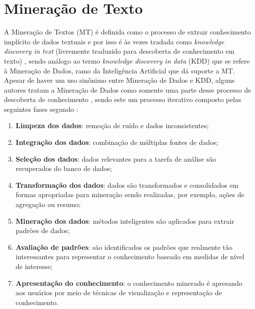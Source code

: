 \section{Mineração de Texto} \label{sec:MineraçãoTexto}
A Mineração de Textos (MT) é definida como o processo de extrair conhecimento implícito de dados textuais \cite{Jo2018TMCIBDC,Feldman:2006:TMH:1076381} e por isso é às vezes tradada como \textit{knowledge discovery in text} (livremente traduzido para descoberta de conhecimento em texto) \cite{Kodratoff:1999:KDT:646358.689959, Feldman:1995:KDT:3001335.3001354}, sendo análogo ao termo \textit{knowledge discovery in data} (KDD) que se refere à Mineração de Dados, ramo da Inteligência Artificial que dá suporte a MT. 
Apesar de haver um uso sinônimo entre Mineração de Dados e KDD, alguns autores tratam a Mineração de Dados como somente uma parte desse processo de descoberta de conhecimento \cite[p.~6]{Han:2011:DMC:1972541}, sendo este um processo iterativo composto pelas seguintes fases segundo :
\begin{enumerate}
    \item \textbf{Limpeza dos dados}: remoção de ruído e dados inconsistentes;
    \item \textbf{Integração dos dados}: combinação de múltiplas fontes de dados;
    \item \textbf{Seleção dos dados}: dados relevantes para a tarefa de análise são recuperados do banco de dados;
    \item \textbf{Transformação dos dados}: dados são transformados e consolidados em formas apropriadas para mineração sendo realizadas, por exemplo, ações de agregação ou resumo;
    \item \textbf{Mineração dos dados}: métodos inteligentes são aplicados para extrair padrões de dados;
    \item \textbf{Avaliação de padrões}: são identificados os padrões que realmente tão interessantes para representar o conhecimento baseado em medidas de nível de interesse;
    \item \textbf{Apresentação do conhecimento}: o conhecimento minerado é apresando aos usuários por meio de técnicas de visualização e representação de conhecimento.
\end{enumerate}
